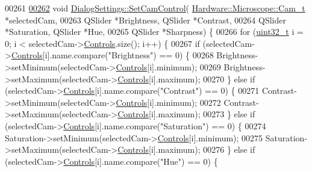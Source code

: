 \begin{DoxyCode}
00261 
\hypertarget{dialogsettings_8cpp_source_l00262}{}\hyperlink{class_dialog_settings_a0ee5b471d5007d534e3ed558064d12be}{00262} \textcolor{keywordtype}{void} \hyperlink{class_dialog_settings_a0ee5b471d5007d534e3ed558064d12be}{DialogSettings::SetCamControl}(
      \hyperlink{struct_hardware_1_1_microscope_1_1_cam__t}{Hardware::Microscope::Cam\_t} *selectedCam,
00263                                    QSlider *Brightness, QSlider *Contrast,
00264                                    QSlider *Saturation, QSlider *Hue,
00265                                    QSlider *Sharpness) \{
00266   \textcolor{keywordflow}{for} (\hyperlink{_soil_math_types_8h_a435d1572bf3f880d55459d9805097f62}{uint32\_t} i = 0; i < selectedCam->\hyperlink{struct_hardware_1_1_microscope_1_1_cam__t_ab86ea92620f15288753a980b6f5d6c9f}{Controls}.size(); i++) \{
00267     \textcolor{keywordflow}{if} (selectedCam->\hyperlink{struct_hardware_1_1_microscope_1_1_cam__t_ab86ea92620f15288753a980b6f5d6c9f}{Controls}[i].name.compare(\textcolor{stringliteral}{"Brightness"}) == 0) \{
00268       Brightness->setMinimum(selectedCam->\hyperlink{struct_hardware_1_1_microscope_1_1_cam__t_ab86ea92620f15288753a980b6f5d6c9f}{Controls}[i].minimum);
00269       Brightness->setMaximum(selectedCam->\hyperlink{struct_hardware_1_1_microscope_1_1_cam__t_ab86ea92620f15288753a980b6f5d6c9f}{Controls}[i].maximum);
00270     \} \textcolor{keywordflow}{else} \textcolor{keywordflow}{if} (selectedCam->\hyperlink{struct_hardware_1_1_microscope_1_1_cam__t_ab86ea92620f15288753a980b6f5d6c9f}{Controls}[i].name.compare(\textcolor{stringliteral}{"Contrast"}) == 0) \{
00271       Contrast->setMinimum(selectedCam->\hyperlink{struct_hardware_1_1_microscope_1_1_cam__t_ab86ea92620f15288753a980b6f5d6c9f}{Controls}[i].minimum);
00272       Contrast->setMaximum(selectedCam->\hyperlink{struct_hardware_1_1_microscope_1_1_cam__t_ab86ea92620f15288753a980b6f5d6c9f}{Controls}[i].maximum);
00273     \} \textcolor{keywordflow}{else} \textcolor{keywordflow}{if} (selectedCam->\hyperlink{struct_hardware_1_1_microscope_1_1_cam__t_ab86ea92620f15288753a980b6f5d6c9f}{Controls}[i].name.compare(\textcolor{stringliteral}{"Saturation"}) == 0) \{
00274       Saturation->setMinimum(selectedCam->\hyperlink{struct_hardware_1_1_microscope_1_1_cam__t_ab86ea92620f15288753a980b6f5d6c9f}{Controls}[i].minimum);
00275       Saturation->setMaximum(selectedCam->\hyperlink{struct_hardware_1_1_microscope_1_1_cam__t_ab86ea92620f15288753a980b6f5d6c9f}{Controls}[i].maximum);
00276     \} \textcolor{keywordflow}{else} \textcolor{keywordflow}{if} (selectedCam->\hyperlink{struct_hardware_1_1_microscope_1_1_cam__t_ab86ea92620f15288753a980b6f5d6c9f}{Controls}[i].name.compare(\textcolor{stringliteral}{"Hue"}) == 0) \{

\end{DoxyCode}
